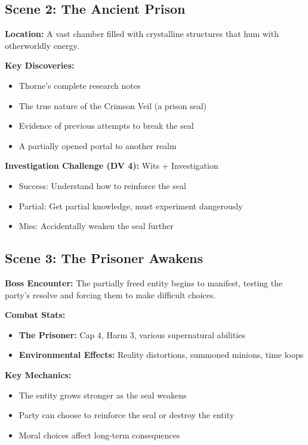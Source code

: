 \documentclass[11pt]{article}
\begin{document}
\subsection*{Scene 2: The Ancient Prison}
\textbf{Location:} A vast chamber filled with crystalline structures that hum with otherworldly energy.

\textbf{Key Discoveries:}
\begin{itemize}[leftmargin=*]
\item Thorne's complete research notes
\item The true nature of the Crimson Veil (a prison seal)
\item Evidence of previous attempts to break the seal
\item A partially opened portal to another realm
\end{itemize}

\textbf{Investigation Challenge (DV 4):} Wits + Investigation
\begin{itemize}
\item Success: Understand how to reinforce the seal
\item Partial: Get partial knowledge, must experiment dangerously
\item Miss: Accidentally weaken the seal further
\end{itemize}

\subsection*{Scene 3: The Prisoner Awakens}
\textbf{Boss Encounter:} The partially freed entity begins to manifest, testing the party's resolve and forcing them to make difficult choices.

\textbf{Combat Stats:}
\begin{itemize}[leftmargin=*]
\item \textbf{The Prisoner:} Cap 4, Harm 3, various supernatural abilities
\item \textbf{Environmental Effects:} Reality distortions, summoned minions, time loops
\end{itemize}

\textbf{Key Mechanics:}
\begin{itemize}[leftmargin=*]
\item The entity grows stronger as the seal weakens
\item Party can choose to reinforce the seal or destroy the entity
\item Moral choices affect long-term consequences
\end{itemize}
\end{document}
